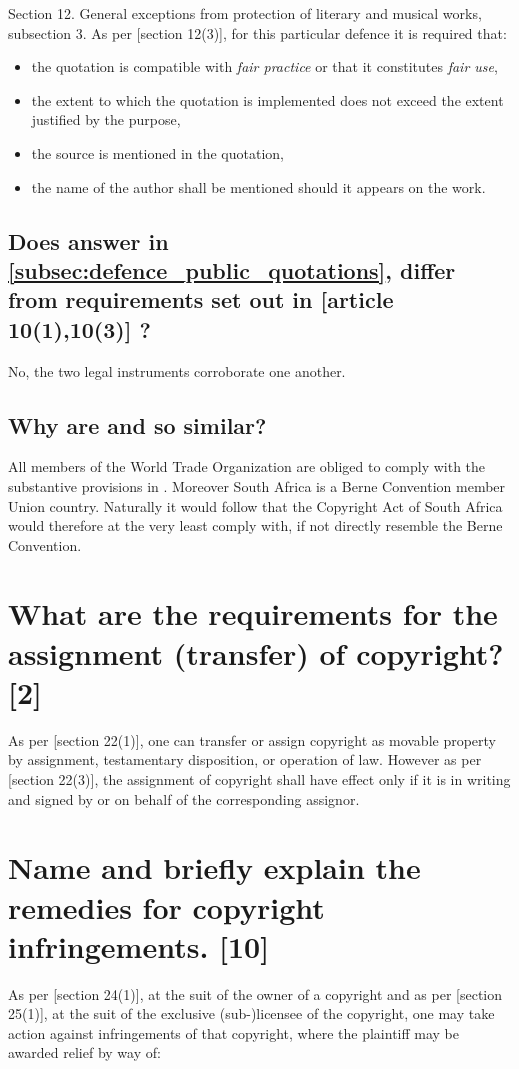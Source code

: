 \documentclass[11pt]{article}
\begin{document}
Section 12. General exceptions from protection of literary and musical works,
subsection 3. As per [section 12(3)]\cite{rsa78_copyrightact}, for this particular defence it is required that:
\begin{itemize}
\item the quotation is compatible with \emph{fair practice} or that it constitutes
\emph{fair use},
\item the extent to which the quotation is implemented does not exceed the extent
justified by the purpose,
\item the source is mentioned in the quotation,
\item the name of the author shall be mentioned should it appears on the work.
\end{itemize}
\subsection{Does answer in \ref{subsec:defence_public_quotations}, differ from requirements set out in [article 10(1),10(3)] \cite{wipo86_berne}?}
\label{sec:org5499b46}
No, the two legal instruments corroborate one another.
\subsection{Why are \cite{rsa78_copyrightact} and \cite{wipo86_berne} so similar?}
\label{sec:org53e39ab}
All members of the World Trade Organization are obliged to comply with the
substantive provisions in \cite{wipo86_berne}. Moreover South Africa is a Berne
Convention member Union country. Naturally it would follow that the Copyright
Act of South Africa would therefore at the very least comply with, if not
directly resemble the Berne Convention.
\section{What are the requirements for the assignment (transfer) of copyright? [2]}
\label{sec:org61e64d1}
As per [section 22(1)]\cite{rsa78_copyrightact}, one can transfer or assign
copyright as movable property by assignment, testamentary disposition, or
operation of law. However as per [section 22(3)]\cite{rsa78_copyrightact}, the
assignment of copyright shall have effect only if it is in writing and signed by
or on behalf of the corresponding assignor.
\section{Name and briefly explain the remedies for copyright infringements. [10]}
\label{sec:org5e1b1b7}
As per [section 24(1)]\cite{rsa78_copyrightact}, at the suit
of the owner of a copyright and as per [section 25(1)]\cite{rsa78_copyrightact},
at the suit of the exclusive (sub-)licensee of the copyright, one may take
action against infringements of that copyright, where the plaintiff may be
awarded relief by way of:
\end{document}
